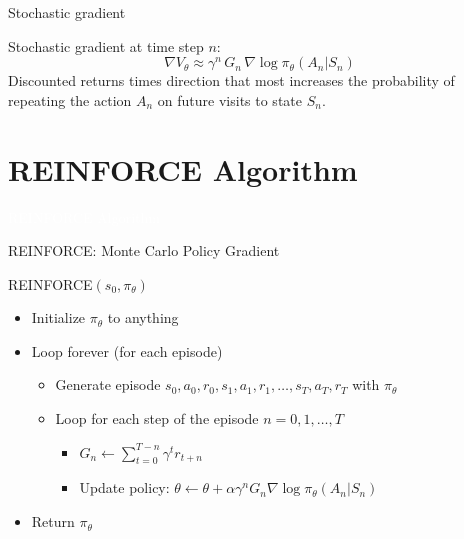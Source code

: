 \documentclass[11pt,table]{beamer}
\begin{document}
\begin{frame}{Stochastic gradient}


Stochastic gradient at time step $n$:
\[
\nabla V_{\theta} \approx \gamma^n\,G_n\,\nabla \log \pi_{\theta}(A_n|S_n)
\]
Discounted returns times direction that most increases the probability of repeating the action $A_n$ on future visits to state $S_n$.

\end{frame}


\section{REINFORCE Algorithm}
{
\begin{frame}
\centering
\Huge
\textcolor{white}{REINFORCE Algorithm}
\thispagestyle{empty}
\end{frame}
}




\begin{frame}{REINFORCE: Monte Carlo Policy Gradient}
\renewcommand{\baselinestretch}{1.3}

\begin{tcolorbox}[colframe=black, boxrule=1pt, sharp corners]
\textcolor{red1}{REINFORCE$(s_0, \pi_{\theta})$}
\begin{itemize}
    \item[] Initialize $\pi_{\theta}$ to anything
    \item[] Loop forever (for each episode)
    \begin{itemize}
        \item[] Generate episode $s_0, a_0, r_0, s_1, a_1, r_1, \dots, s_T, a_T, r_T$ with $\pi_{\theta}$
        \item[] Loop for each step of the episode $n = 0, 1, \dots, T$
        \begin{itemize}
            \item[] $G_n \leftarrow \sum_{t=0}^{T-n} \gamma^{t} r_{t+n}$
            \item[] Update policy: $\theta \leftarrow \theta + \alpha \gamma^n G_n \nabla \log \pi_{\theta}(A_n | S_n)$
        \end{itemize}
    \end{itemize}
    \item[] Return $\pi_{\theta}$
\end{itemize}
\end{tcolorbox}

\end{frame}
\end{document}
